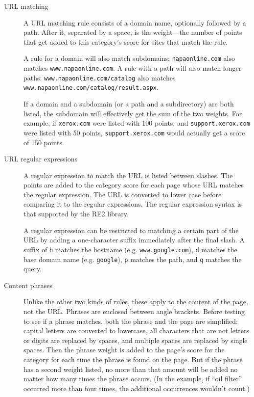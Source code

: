 \documentclass{article}
\begin{document}
\begin{description}

\item[URL matching] A URL matching rule consists of a domain name, optionally followed by a path. 
After it, separated by a space, is the weight---the number of points that get added to this category's score 
for sites that match the rule. 

A rule for a domain will also match subdomains: \verb"napaonline.com" also matches \verb"www.napaonline.com".
A rule with a path will also match longer paths: \verb"www.napaonline.com/catalog" also matches 
\verb"www.napaonline.com/catalog/result.aspx".

If a domain and a subdomain (or a path and a subdirectory) 
are both listed, the subdomain will effectively get the sum of the two weights. For example, if \verb"xerox.com"
were listed with 100 points, and \verb"support.xerox.com" were listed with 50 points, \verb"support.xerox.com" 
would actually get a score of 150 points.

\item[URL regular expressions] A regular expression to match the URL is listed between slashes. 
The points are added to the category score for each page whose URL matches the regular expression. 
The URL is converted to lower case before comparing it to the regular expressions.
The regular expression syntax is that supported by the RE2 library.

A regular expression can be restricted to matching a certain part of the URL by adding a one-character suffix
immediately after the final slash.
A suffix of \verb"h" matches the hostname (e.g. \verb"www.google.com"), 
\verb"d" matches the base domain name (e.g. \verb"google"),
\verb"p" matches the path,
and \verb"q" matches the query.

\item[Content phrases] Unlike the other two kinds of rules, these apply to the content of the page, not the URL. 
Phrases are enclosed between angle brackets. Before testing to see if a phrase matches, 
both the phrase and the page are simplified: capital letters are converted to lowercase, 
all characters that are not letters or digits are replaced by spaces,
and multiple spaces are replaced by single spaces. Then the phrase weight is added to the page's score for the category 
for each time the phrase is found on the page. But if the phrase has a second weight listed, 
no more than that amount will be added no matter how many times the phrase occurs. 
(In the example, if ``oil filter'' occurred more than four times, the additional occurrences wouldn't count.)

\end{description}
\end{document}
